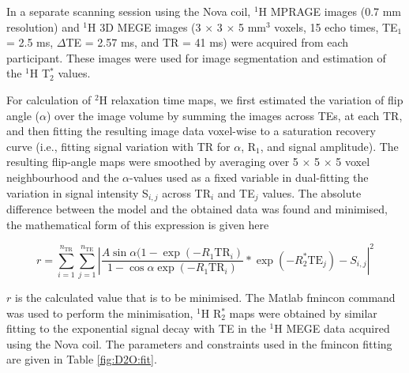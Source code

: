 In a separate scanning session using the Nova coil, $^1$H  \ac{MPRAGE} images (0.7 mm resolution) and $^1$H 3D \ac{MEGE} images (3 $\times$ 3 $\times$ 5 mm$^3$ voxels, 15 echo times, TE$_1$ = 2.5 ms, $\Delta$TE = 2.57 ms, and \ac{TR} = 41 ms) were acquired from each participant. These images were used for image segmentation and estimation of the $^1$H T$_2^*$ values. 

For calculation of $^2$H relaxation time maps, we first estimated the variation of flip angle ($\alpha$) over the image volume by summing the images across \ac{TE}s, at each \ac{TR}, and then fitting the resulting image data voxel-wise to a saturation recovery curve (i.e., fitting signal variation with \ac{TR} for $\alpha$, R$_1$, and signal amplitude). The resulting flip-angle maps were smoothed by averaging over 5 $\times$ 5 $\times$ 5 voxel neighbourhood and the $\alpha$-values used as a fixed variable in dual-fitting the variation in signal intensity S$_{i,j}$ across TR$_i$ and TE$_j$  values. The absolute difference between the model and the obtained data was found and minimised, the mathematical form of this expression is given here  

\begin{equation}
     r = \sum_{i=1}^{n_{\text{TR}}}\sum_{j=1}^{n_{\text{TE}}}\left|\frac{A\sin{\alpha}(1-\exp(-R_1 \text{TR}_i)}{1-\cos{\alpha}\exp(-R_1 \text{TR}_i)}*\exp(-R_2^*\text{TE}_j) - S_{i,j}\right|^2
     \label{eqn.min}
\end{equation}

$r$ is the calculated value that is to be minimised. The Matlab fmincon command was used to perform the minimisation, $^1$H R$_2^*$ maps were obtained by similar fitting to the exponential signal decay with \ac{TE} in the $^1$H \ac{MEGE} data acquired using the Nova coil. The parameters and constraints used in the fmincon fitting are given in Table \ref{fig:D2O:fit}.

